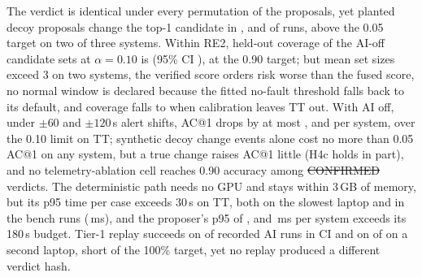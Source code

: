 The verdict is identical under every permutation of the proposals, yet planted decoy proposals change the top-1 candidate in ,  and  of runs, above the 0.05 target on two of three systems.
Within RE2, held-out coverage of the AI-off candidate sets at $\alpha = 0.10$ is  (95\% CI ), at the 0.90 target; but mean set sizes exceed 3 on two systems, the verified score orders risk worse than the fused score, no normal window is declared \NOFAULT because the fitted no-fault threshold falls back to its default, and coverage falls to  when calibration leaves TT out.
With AI off, under $\pm 60$ and $\pm 120$\,s alert shifts, AC@1 drops by at most ,  and  per system, over the 0.10 limit on TT; synthetic decoy change events alone cost no more than 0.05 AC@1 on any system, but a true change raises AC@1 little (H4c holds in part), and no telemetry-ablation cell reaches 0.90 accuracy among \st{CONFIRMED} verdicts.
The deterministic path needs no GPU and stays within 3\,GB of memory, but its p95 time per case exceeds 30\,s on TT, both on the slowest laptop and in the bench runs (\,ms), and the proposer's p95 of ,  and \,ms per system exceeds its 180\,s budget.
Tier-1 replay succeeds on  of  recorded AI runs in CI and on  of  on a second laptop, short of the 100\% target, yet no replay produced a different verdict hash.
